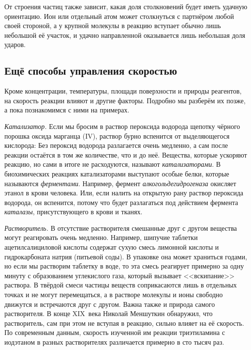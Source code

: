 От строения частиц также зависит, какая доля столкновений будет иметь удачную ориентацию. Ион или отдельный атом может столкнуться с партнёром любой своей стороной, а у крупной молекулы в реакцию вступает обычно лишь небольшой её участок, и удачно направленной оказывается лишь небольшая доля ударов.

\subsection*{Ещё способы управления скоростью}

Кроме концентрации, температуры, площади поверхности и природы реагентов, на скорость реакции влияют и другие факторы. Подробно мы разберём их позже, а пока познакомимся с ними на примерах.

\emph{Катализатор.} Если мы бросим в раствор пероксида водорода щепотку чёрного порошка оксида марганца (IV), раствор бурно вспенится от выделяющегося кислорода:
Без  пероксид водорода разлагается очень медленно, а сам  после реакции остаётся в том же количестве, что и до неё. Вещества, которые ускоряют реакцию, но сами в итоге не расходуются, называют \emph{катализаторами}. В биохимических реакциях катализаторами выступают особые белки, которые называются \emph{ферментами}. Например, фермент \emph{алкогольдегидрогеназа} окисляет этанол в крови человека. Или, если налить на открытую рану раствор пероксида водорода, он вспенится, потому что будет разлагаться под действием фермента \emph{каталазы}, присутствующего в крови и тканях.

\emph{Растворитель.} В отсутствие растворителя смешанные друг с другом вещества могут реагировать очень медленно. Например, шипучие таблетки ацетилсалициловой кислоты содержат сухую смесь лимонной кислоты и гидрокарбоната натрия (питьевой соды). В упаковке она может храниться годами, но если мы растворим таблетку в воде, то эта смесь реагирует примерно за одну минуту с образованием углекислого газа, который вызывает <<вскипание>> раствора. В твёрдой смеси частицы веществ соприкасаются лишь в отдельных точках и не могут перемещаться, а в растворе молекулы и ионы свободно движутся и встречаются друг с другом. Важна также и природа самого растворителя. В конце XIX~века Николай Меншуткин обнаружил, что растворитель, сам при этом не вступая в реакцию, сильно влияет на её скорость. По современным данным, скорость изученной им реакции триэтиламина с иодэтаном в разных растворителях различается примерно в сто тысяч раз.

